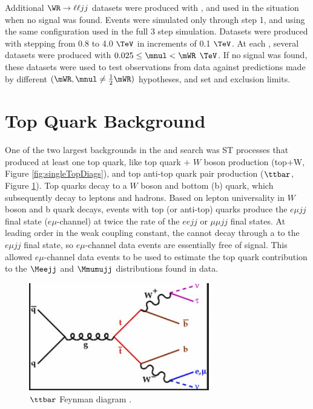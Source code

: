 Additional $\WR \rightarrow \ell\ell jj$ datasets were produced with \PYTHIA, and used in the situation when no \WR 
signal was found.  Events were simulated only through step 1, and using the same \PYTHIA configuration used in the 
full 3 step simulation.  Datasets were produced with \mWR stepping from 0.8 to 4.0 $\TeV$ in increments of 0.1 $\TeV$.  
At each \mWR, several datasets were produced with $0.025 \leq \mnul < \mWR$ $\TeV$.  If no \WR signal was found, these 
datasets were used to test observations from data against predictions made by different $(\mWR, \mnul \neq \frac{1}{2}\mWR)$ 
hypotheses, and set \mWR and \mnul exclusion limits.



\section{Top Quark Background}
\label{sec:topQrkBkgnds}
One of the two largest backgrounds in the \WR and \nul search was ST processes that produced at least 
one top quark, like top quark $\plus$ $W$ boson production (top+W, Figure \ref{fig:singleTopDiags}), 
and top anti-top quark pair production ($\ttbar$, Figure \ref{fig:ttbarDiag}).  Top 
quarks decay to a $W$ boson and bottom (b) quark, which subsequently decay to leptons and hadrons.  
Based on lepton universality in $W$ boson and b quark decays, events with top (or anti-top) quarks produce 
the $e\mu jj$ final state ($e\mu$-channel) at twice the rate of the $eejj$ or $\mu\mu jj$ final states.  At leading order 
in the weak coupling constant, the \WR cannot decay through a \nul to the $e\mu jj$ final state, so $e\mu$-channel 
data events are essentially free of \WR signal.  This allowed $e\mu$-channel data events to be used to 
estimate the top quark contribution to the $\Meejj$ and $\Mmumujj$ distributions found in data.

\begin{figure}[h]
	\centering
	\includegraphics[width=0.7\textwidth]{figures/topAntiTopFeynDiagram.png}
	\caption{$\ttbar$ Feynman diagram \cite{ttbarDiagram}.}
	\label{fig:ttbarDiag}
\end{figure}

